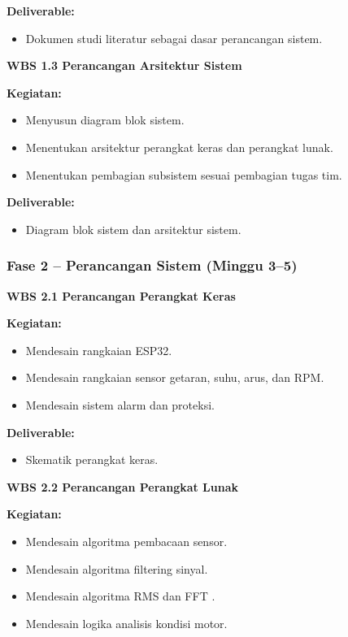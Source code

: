\documentclass{elsinta}
\begin{document}
\textbf{Deliverable:}
\begin{itemize}
    \item Dokumen studi literatur sebagai dasar perancangan sistem.
\end{itemize}

\textbf{WBS 1.3 Perancangan Arsitektur Sistem}

\textbf{Kegiatan:}
\begin{itemize}
    \item Menyusun diagram blok sistem.
    \item Menentukan arsitektur perangkat keras dan perangkat lunak.
    \item Menentukan pembagian subsistem sesuai pembagian tugas tim.
\end{itemize}

\textbf{Deliverable:}
\begin{itemize}
    \item Diagram blok sistem dan arsitektur sistem.
\end{itemize}

\subsubsection*{Fase 2 -- Perancangan Sistem (Minggu 3--5)}

\textbf{WBS 2.1 Perancangan Perangkat Keras}

\textbf{Kegiatan:}
\begin{itemize}
    \item Mendesain rangkaian ESP32.
    \item Mendesain rangkaian sensor getaran, suhu, arus, dan RPM.
    \item Mendesain sistem alarm dan proteksi.
\end{itemize}

\textbf{Deliverable:}
\begin{itemize}
    \item Skematik perangkat keras.
\end{itemize}

\textbf{WBS 2.2 Perancangan Perangkat Lunak}

\textbf{Kegiatan:}
\begin{itemize}
    \item Mendesain algoritma pembacaan sensor.
    \item Mendesain algoritma filtering sinyal.
    \item Mendesain algoritma RMS dan FFT \cite{oppenheim2010,randall2011}.
    \item Mendesain logika analisis kondisi motor.
\end{itemize}
\end{document}
